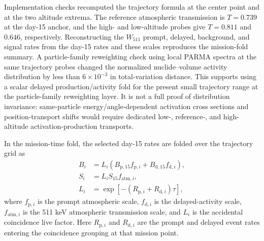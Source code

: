 \documentclass[preprint,12pt]{elsarticle}
\newcommand{\wii}{W_{511}}
\begin{document}
Implementation checks recomputed the trajectory formula at the center point and
at the two altitude extrema. The reference atmospheric transmission is
$T=0.739$ at the day-15 anchor, and the high- and low-altitude probes give
$T=0.811$ and $0.646$, respectively. Reconstructing the $\wii$ prompt,
delayed, background, and signal rates from the day-15 rates and these scales
reproduces the mission-fold summary. A particle-family reweighting check using
local PARMA spectra at the same trajectory probes changed the normalized
nuclide--volume activity distribution by less than $6\times10^{-3}$ in
total-variation distance. This supports using a scalar delayed
production/activity fold for the present small trajectory range at the
particle-family reweighting layer. It is not a full proof of distribution
invariance: same-particle energy/angle-dependent activation cross sections and
position-transport shifts would require dedicated low-, reference-, and
high-altitude activation-production transports.

In the mission-time fold, the selected day-15 rates are folded over the
trajectory grid as
\begin{align}
  B_i &= L_i\left(B_{\mathrm{p},15} f_{\mathrm{p},i}
        + B_{\mathrm{d},15} f_{\mathrm{d},i}\right),\\
  S_i &= L_i S_{15} f_{\mathrm{atm},i},\\
  L_i &= \exp[-(R_{\mathrm{p},i}+R_{\mathrm{d},i})\tau],
\end{align}
where $f_{\mathrm{p},i}$ is the prompt atmospheric scale,
$f_{\mathrm{d},i}$ is the delayed-activity scale, $f_{\mathrm{atm},i}$ is the
511 keV atmospheric transmission scale, and $L_i$ is the accidental
coincidence live factor. Here $R_{\mathrm{p},i}$ and $R_{\mathrm{d},i}$ are the
prompt and delayed event rates entering the coincidence grouping at that
mission point.
\end{document}
